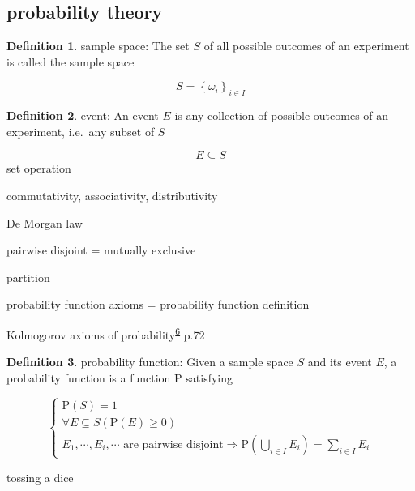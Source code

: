 \documentclass[
]{book}
\theoremstyle{definition}
\newtheorem{definition}{Definition}[chapter]
\theoremstyle{definition}
\theoremstyle{definition}
\theoremstyle{definition}
\theoremstyle{remark}
\begin{document}
\hypertarget{probability-theory}{%
\subsection{probability theory}\label{probability-theory}}

\begin{definition}
\protect\hypertarget{def:unnamed-chunk-2}{}\label{def:unnamed-chunk-2}sample space: The set \(S\) of all possible outcomes of an experiment is called the sample space
\end{definition}

\[
S=\left\{ \omega_{{\scriptscriptstyle i}}\right\} _{{\scriptscriptstyle i}\in I}
\]

\begin{definition}
\protect\hypertarget{def:unnamed-chunk-3}{}\label{def:unnamed-chunk-3}event: An event \(E\) is any collection of possible outcomes of an experiment, i.e.~any subset of \(S\)
\end{definition}

\[
E \subseteq S
\]
set operation

commutativity, associativity, distributivity

De Morgan law

pairwise disjoint = mutually exclusive

partition

probability function axioms = probability function definition

Kolmogorov axioms of probability\textsuperscript{\protect\hyperlink{ref-zhang2021}{6}} p.72

\begin{definition}
\protect\hypertarget{def:unnamed-chunk-4}{}\label{def:unnamed-chunk-4}probability function: Given a sample space \(S\) and its event \(E\), a probability function is a function \(\mathrm{P}\) satisfying
\end{definition}

\[
\begin{cases}
\mathrm{P}\left(S\right)=1\\
\forall E\subseteq S\left(\mathrm{P}\left(E\right)\ge0\right)\\
E_{{\scriptscriptstyle 1}},\cdots,E_{{\scriptscriptstyle i}},\cdots\text{ are pairwise disjoint}\Rightarrow\mathrm{P}\left(\bigcup\limits _{i\in I}E_{{\scriptscriptstyle i}}\right)=\sum\limits _{i\in I}E_{{\scriptscriptstyle i}}
\end{cases}
\]

tossing a dice
\end{document}
